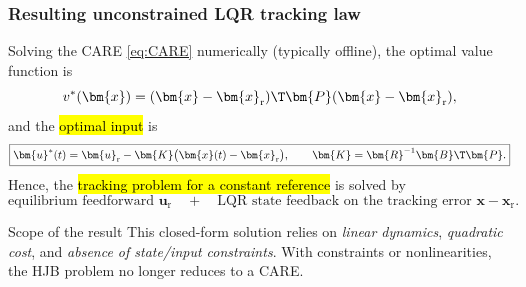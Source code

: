 \begin{frame}
	\frametitle{Resulting unconstrained LQR tracking law}
	Solving the CARE \eqref{eq:CARE} numerically (typically offline), the optimal value function is
	\begin{equation}
		v^*(\bm{x})=(\bm{x}-\bm{x}_{\mathrm{r}})\T\bm{P}(\bm{x}-\bm{x}_{\mathrm{r}}),
	\end{equation}\pause%
	and the \hl{optimal input} is
	\begin{equation}
		\boxed{\bm{u}^*(t)=\bm{u}_{\mathrm{r}}-
			\bm{K}\bigl(\bm{x}(t)-\bm{x}_{\mathrm{r}}\bigr),
			\qquad \bm{K}=\bm{R}^{-1}\bm{B}\T\bm{P}.}
	\end{equation}\pause%
	Hence, the \hl{tracking problem for a constant reference} is solved by
	\begin{equation}
		\text{equilibrium feedforward }\bm{u}_{\mathrm{r}}
		\quad + \quad
		\text{LQR state feedback on the tracking error }\bm{x}-\bm{x}_{\mathrm{r}}.
	\end{equation}\vspace{-0.4cm}\pause%
	\begin{block}{Scope of the result}
		This closed-form solution relies on \emph{linear dynamics}, \emph{quadratic cost}, and \emph{absence of state/input constraints}. With constraints or nonlinearities, the HJB problem no longer reduces to a CARE.
	\end{block}
\end{frame}

